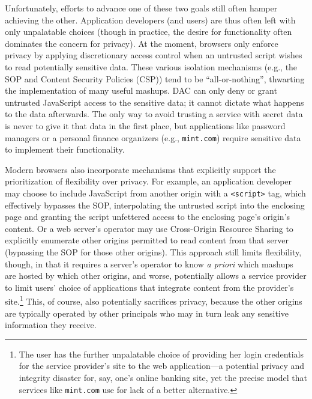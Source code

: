 Unfortunately, efforts to advance one of these two goals still often hamper achieving
the other. Application developers (and users) are thus often left with
only unpalatable choices (though in practice, the desire for
functionality often dominates the concern for privacy).
%
At the moment, browsers only enforce privacy by applying discretionary
access control when an untrusted script wishes to read potentially
sensitive data.
%
These various isolation mechanisms (e.g., the SOP and Content Security Policies (CSP)) tend
to be ``all-or-nothing'', thwarting the implementation
of many useful mashups.
%
DAC can only deny or grant
untrusted JavaScript access to the sensitive data; it cannot
dictate what happens to the data afterwards.
%
The only way to avoid trusting a service with secret data is never to give
it that data in the first place, but applications like password
managers or a personal finance organizers (e.g., {\tt mint.com}) require
sensitive data to implement their functionality.

Modern browsers also incorporate mechanisms that explicitly support
the prioritization of flexibility over privacy. For example, an
application developer may choose to include JavaScript from another
origin with a {\tt <script>} tag, which effectively bypasses the SOP,
interpolating the untrusted script into the enclosing page and
granting the script unfettered access to the enclosing page's origin's
content. Or a web server's operator may use Cross-Origin Resource
Sharing to
explicitly enumerate other origins permitted to read content from that
server (bypassing the SOP for those other origins).
This approach still limits flexibility, though, in that it requires a
server's operator to know {\em a priori} which mashups are hosted by
which other origins, and worse, potentially allows a service provider
to limit users' choice of applications that integrate content from the
provider's site.\footnote{The user has the further unpalatable
  choice of providing her login credentials for the service
  provider's site to the web application---a potential
  privacy and integrity disaster for, say, one's online banking site,
  yet the precise model that services like {\tt mint.com} use for lack
  of a better alternative.} This, of course, also potentially sacrifices
privacy, because the other origins are typically operated by other
principals who may in turn leak any sensitive information they
receive.

